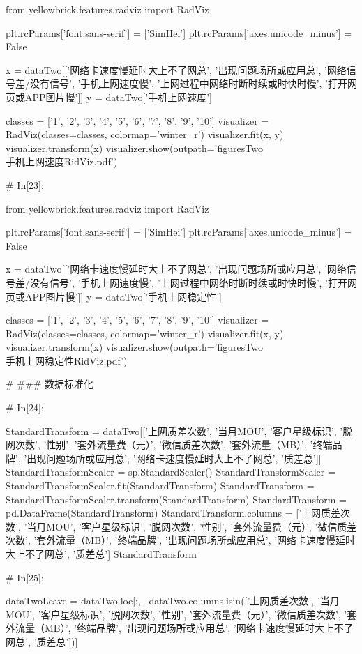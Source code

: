 \documentclass{MathorCupmodeling}
\begin{document}
\begin{python}
	
	from yellowbrick.features.radviz import RadViz
	
	plt.rcParams['font.sans-serif'] = ['SimHei']
	plt.rcParams['axes.unicode_minus'] = False
	
	x = dataTwo[['网络卡速度慢延时大上不了网总', '出现问题场所或应用总', '网络信号差/没有信号', '手机上网速度慢', '上网过程中网络时断时续或时快时慢', '打开网页或APP图片慢']]
	y = dataTwo['手机上网速度']
	
	classes = ['1', '2', '3', '4', '5', '6', '7', '8', '9', '10']
	visualizer = RadViz(classes=classes, colormap='winter_r')
	visualizer.fit(x, y)
	visualizer.transform(x)
	visualizer.show(outpath='figuresTwo\\[附件2]手机上网速度RidViz.pdf')
	
	# In[23]:
	
	
	from yellowbrick.features.radviz import RadViz
	
	plt.rcParams['font.sans-serif'] = ['SimHei']
	plt.rcParams['axes.unicode_minus'] = False
	
	x = dataTwo[['网络卡速度慢延时大上不了网总', '出现问题场所或应用总', '网络信号差/没有信号', '手机上网速度慢', '上网过程中网络时断时续或时快时慢', '打开网页或APP图片慢']]
	y = dataTwo['手机上网稳定性']
	
	classes = ['1', '2', '3', '4', '5', '6', '7', '8', '9', '10']
	visualizer = RadViz(classes=classes, colormap='winter_r')
	visualizer.fit(x, y)
	visualizer.transform(x)
	visualizer.show(outpath='figuresTwo\\[附件2]手机上网稳定性RidViz.pdf')
	
	# ### 数据标准化
	
	# In[24]:
	
	
	StandardTransform = dataTwo[['上网质差次数', '当月MOU', '客户星级标识', '脱网次数', '性别', '套外流量费（元）', '微信质差次数', '套外流量（MB）', '终端品牌', '出现问题场所或应用总', '网络卡速度慢延时大上不了网总', '质差总']]
	StandardTransformScaler = sp.StandardScaler()
	StandardTransformScaler = StandardTransformScaler.fit(StandardTransform)
	StandardTransform = StandardTransformScaler.transform(StandardTransform)
	StandardTransform = pd.DataFrame(StandardTransform)
	StandardTransform.columns = ['上网质差次数', '当月MOU', '客户星级标识', '脱网次数', '性别', '套外流量费（元）', '微信质差次数', '套外流量（MB）', '终端品牌', '出现问题场所或应用总', '网络卡速度慢延时大上不了网总', '质差总']
	StandardTransform
	
	# In[25]:
	
	
	dataTwoLeave = dataTwo.loc[:, ~dataTwo.columns.isin(['上网质差次数', '当月MOU', '客户星级标识', '脱网次数', '性别', '套外流量费（元）', '微信质差次数', '套外流量（MB）', '终端品牌', '出现问题场所或应用总', '网络卡速度慢延时大上不了网总', '质差总'])]
	

\end{python}
\end{document}
